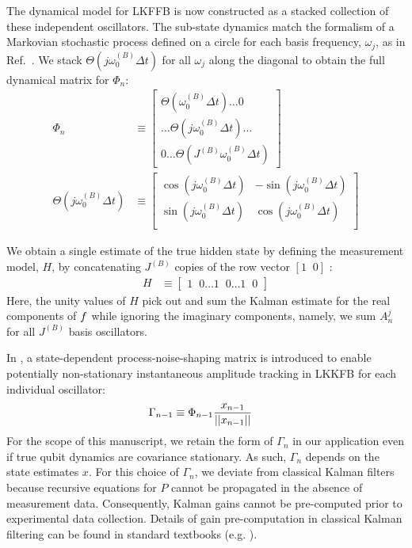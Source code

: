 The dynamical model for LKFFB is now constructed as a stacked collection of these independent oscillators. The sub-state dynamics match the formalism of a Markovian stochastic process defined on a circle for each basis frequency, $\omega_j$, as in Ref.~\cite{karlin1975first}. We stack $\Theta(j \omega_0^{(B)}\Delta t) $ for all $\omega_j$ along the diagonal to obtain the full dynamical matrix for $\Phi_n$:
\begin{align}
	\Phi_{n} & \equiv \begin{bmatrix} 
		\Theta(\omega_0^{(B)}\Delta t)\hdots 0  \\ 
		\hdots \Theta(j\omega_0^{(B)}\Delta t) \hdots \\
		0 \hdots \Theta(J^{(B)} \omega_0^{(B)}\Delta t)  \end{bmatrix}\\ 
	\Theta(j \omega_0^{(B)}\Delta t) &\equiv \begin{bmatrix} \cos(j \omega_0^{(B)}\Delta t) & -\sin(j \omega_0^{(B)}\Delta t) \\ \sin(j \omega_0^{(B)}\Delta t) & \cos(j \omega_0^{(B)}\Delta t) \\ \end{bmatrix} \label{eqn:ap_approxSP:LKFFB_Phi} 
\end{align}

We obtain a single estimate of the true hidden state by defining the measurement model, $H$, by concatenating $J^{(B)}$ copies of the row vector $[1\;\;0]$ :
\begin{align}
	H & \equiv \begin{bmatrix} 1\;\;0 \hdots 1\;\;0 \hdots 1\;\;0 \end{bmatrix}
\end{align}
Here, the unity values of $H$ pick out and sum the Kalman estimate for the real components of $f$ while ignoring the imaginary components, namely, we sum $A^{j}_{n}$ for all $J^{(B)}$ basis oscillators.

In \cite{livska2007}, a state-dependent process-noise-shaping matrix is introduced to enable potentially non-stationary instantaneous amplitude tracking in LKKFB for each individual oscillator: 
\begin{align}
	\Gamma_{n-1} &\equiv \Phi_{n-1}\frac{x_{n-1}}{||x_{n-1}||}
\end{align}
For the scope of this manuscript, we retain the form of $\Gamma_{n}$ in our application even if true qubit dynamics are covariance stationary. As such, $\Gamma_{n}$ depends on the state estimates $x$. For this choice of $\Gamma_{n}$, we deviate from classical Kalman filters because recursive equations for $P$ cannot be propagated in the absence of measurement data. Consequently, Kalman gains cannot be pre-computed prior to experimental data collection. Details of gain pre-computation in classical Kalman filtering can be found in standard textbooks (e.g. \cite{grewal2001theory}).

